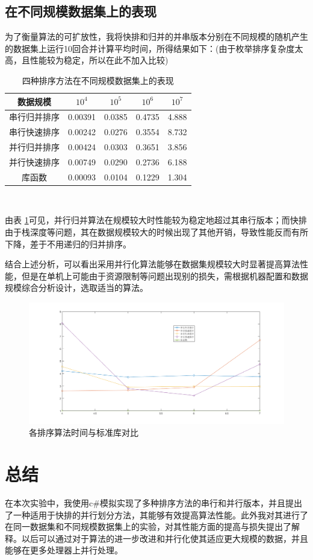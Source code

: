 \documentclass[UTF8]{article}
\begin{document}
\subsection{在不同规模数据集上的表现}
为了衡量算法的可扩放性，我将快排和归并的并串版本分别在不同规模的随机产生的数据集上运行10回合并计算平均时间，所得结果如下：(由于枚举排序复杂度太高，且性能较为稳定，所以在此不加入比较)\\
\begin{table}
\centering
\begin{tabular}{|c|c|c|c|c|}
	\hline
	数据规模 & $10^4$ & $10^5$ & $10^6$ & $10^7$ \\
	\hline
	串行归并排序 & 0.00391 & 0.0385 & 0.4735 & 4.888 \\
	\hline
	串行快速排序 & 0.00242 & 0.0276 & 0.3554 & 8.732 \\
	\hline
	并行归并排序 & 0.00424 & 0.0303 & 0.3651 & 3.856 \\
	\hline
	并行快速排序 & 0.00749 & 0.0290 & 0.2736 & 6.188 \\
	\hline
	库函数      & 0.00093 & 0.0104 & 0.1229 & 1.304 \\
	\hline
\end{tabular}
\caption{四种排序方法在不同规模数据集上的表现}
\label{differentScale}
\end{table} \\
\par 由表 \ref{differentScale}可见，并行归并算法在规模较大时性能较为稳定地超过其串行版本；而快排由于栈深度等问题，其在数据规模较大的时候出现了其他开销，导致性能反而有所下降，差于不用递归的归并排序。
\par 结合上述分析，可以看出采用并行化算法能够在数据集规模较大时显著提高算法性能，但是在单机上可能由于资源限制等问题出现别的损失，需根据机器配置和数据规模综合分析设计，选取适当的算法。
\begin{figure}
	\includegraphics[width=1.0\textwidth]{growth.png}
	\caption{各排序算法时间与标准库对比}
	\label{finalComparison}
\end{figure} 
\section{总结}
在本次实验中，我使用c\#模拟实现了多种排序方法的串行和并行版本，并且提出了一种适用于快排的并行划分方法，其能够有效提高算法性能。此外我对其进行了在同一数据集和不同规模数据集上的实验，对其性能方面的提高与损失提出了解释。以后可以通过对于算法的进一步改进和并行化使其适应更大规模的数据，并且能够在更多处理器上并行处理。
\end{document}
